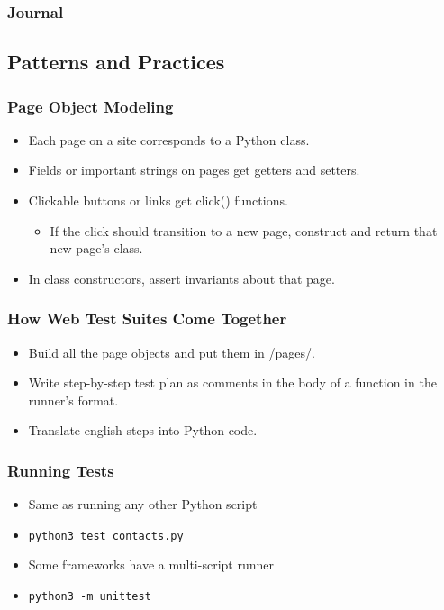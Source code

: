 \begin{frame}
  \frametitle{Journal}
\end{frame}

\subsection{Patterns and Practices}

\begin{frame}
  \frametitle{Page Object Modeling}
  \begin{itemize}
    \item Each page on a site corresponds to a Python class.
    \item Fields or important strings on pages get getters and setters.
    \item Clickable buttons or links get click() functions.
    \begin{itemize}
      \item If the click should transition to a new page, construct and return that new page's class.
    \end{itemize}
    \item In class constructors, assert invariants about that page.
  \end{itemize}
\end{frame}

\begin{frame}
  \frametitle{How Web Test Suites Come Together}
  \begin{itemize}
    \item Build all the page objects and put them in /pages/.
    \item Write step-by-step test plan as comments in the body of a function in the runner's format.
    \item Translate english steps into Python code.
  \end{itemize}
\end{frame}

\begin{frame}
  \frametitle{Running Tests}
  \begin{itemize}
    \item Same as running any other Python script
    \item \texttt{python3 test\_contacts.py} %
    \item Some frameworks have a multi-script runner
    \item \texttt{python3 -m unittest}
  \end{itemize}
\end{frame}
